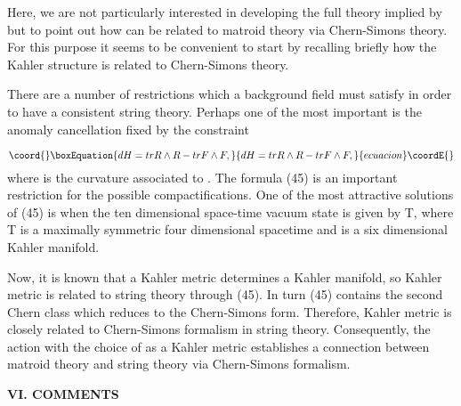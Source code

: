 \documentclass[a4paper,12pt]{article}
\begin{document}
Here, we are not particularly interested in developing the full theory
implied by \coordHE{} but to point out how \coordHE{} can be related to matroid
theory via Chern-Simons theory. For this purpose it seems to be convenient
to start by recalling briefly how the Kahler structure is related to
Chern-Simons theory.

There are a number of restrictions which a background field must satisfy in
order to have a consistent string theory. Perhaps one of the most important
is the anomaly cancellation fixed by the constraint\coordHE{}

\begin{equation}\coord{}\boxEquation{
dH=trR\wedge R-trF\wedge F,  \label{45}
}{
dH=trR\wedge R-trF\wedge F,  }{ecuacion}\coordE{}\end{equation}
where \coordHE{} is the curvature associated to \coordHE{}. The formula (45) is
an important restriction for the possible compactifications. One of the most
attractive solutions of (45) is when the ten dimensional space-time vacuum
state is given by T\coordHE{}, where T\coordHE{} is a maximally symmetric
four dimensional spacetime and \coordHE{} is a six dimensional Kahler manifold.

Now, it is known that a Kahler metric determines a Kahler manifold, so
Kahler metric is related to string theory through (45). In turn (45)
contains the second Chern class \coordHE{} which reduces to the
Chern-Simons form. Therefore, Kahler metric is closely related to
Chern-Simons formalism in string theory. Consequently, the action \coordHE{}
with the choice of \coordHE{} as a Kahler metric establishes a
connection between matroid theory and string theory via Chern-Simons
formalism.
\bigskip

\smallskip

\noindent \textbf{VI. COMMENTS}

\bigskip
\end{document}
